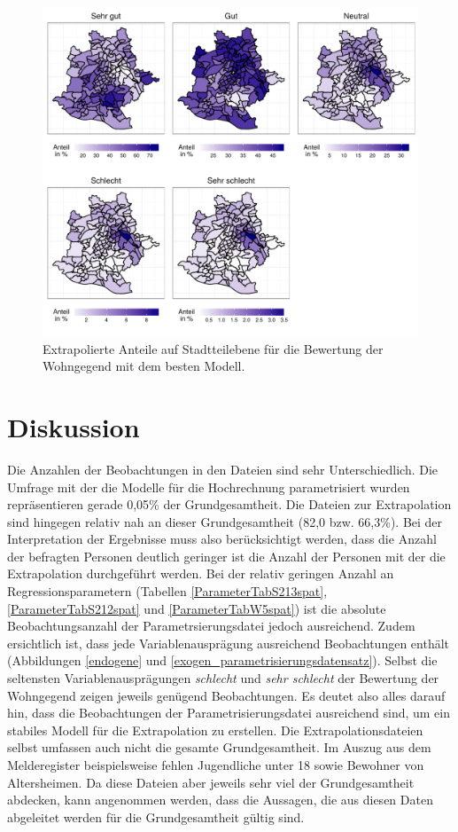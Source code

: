 \documentclass{Vorlage}
\begin{document}
\begin{figure}[h]
 \begin{center}
 \includegraphics[scale=0.8]{Pictures/BWohnExtra}
 \caption{Extrapolierte Anteile auf Stadtteilebene für die Bewertung der Wohngegend mit dem besten Modell.}
 \label{WohnExtra}
 \end{center}
\end{figure}

\clearpage
\section{Diskussion}
Die Anzahlen der Beobachtungen in den Dateien sind sehr Unterschiedlich. Die Umfrage mit der die Modelle für die Hochrechnung parametrisiert wurden repräsentieren gerade 0,05\% der Grundgesamtheit. Die Dateien zur Extrapolation sind hingegen relativ nah an dieser Grundgesamtheit (82,0 bzw. 66,3\%). Bei der Interpretation der Ergebnisse muss also berücksichtigt werden, dass die Anzahl der befragten Personen deutlich geringer ist die Anzahl der Personen mit der die Extrapolation durchgeführt werden. Bei der relativ geringen Anzahl an Regressionsparametern (Tabellen \ref{ParameterTabS213spat}, \ref{ParameterTabS212spat} und \ref{ParameterTabW5spat}) ist die absolute Beobachtungsanzahl der Parametrsierungsdatei jedoch ausreichend. Zudem ersichtlich ist, dass jede Variablenausprägung ausreichend Beobachtungen enthält (Abbildungen \ref{endogene} und \ref{exogen_parametrisierungsdatensatz}). Selbst die seltensten Variablenausprägungen \textit{schlecht} und \textit{sehr schlecht} der Bewertung der Wohngegend zeigen jeweils genügend Beobachtungen. Es deutet also alles darauf hin, dass die Beobachtungen der Parametrisierungsdatei ausreichend sind, um ein stabiles Modell für die Extrapolation zu erstellen. Die Extrapolationsdateien selbst umfassen auch nicht die gesamte Grundgesamtheit. Im Auszug aus dem Melderegister beispielsweise fehlen Jugendliche unter 18 sowie Bewohner von Altersheimen. Da diese Dateien aber jeweils sehr viel der Grundgesamtheit abdecken, kann angenommen werden, dass die Aussagen, die aus diesen Daten abgeleitet werden für die Grundgesamtheit gültig sind.
\end{document}

